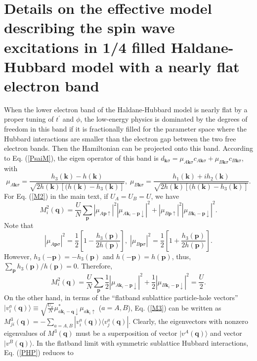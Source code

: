 \documentclass[amsmath,superscriptaddress,showpacs,aps,prl,twocolumn]{revtex4-1}
\begin{document}
\section{Details on the effective model describing the spin wave excitations in 1/4 filled Haldane-Hubbard model with a nearly flat electron band}
\par When the lower electron band of the Haldane-Hubbard model is nearly flat by a proper tuning of $t^\prime$ and $\phi$, the low-energy physics is dominated by the degrees of freedom in this band if it is fractionally filled for the parameter space where the Hubbard interactions are smaller than the electron gap between the two free electron bands. Then the Hamiltonian can be projected onto this band. According to Eq. (\ref{PsaiM}), the eigen operator of this band is $d_{\mathbf{k}\sigma}=\mu_{A\mathbf{k}\sigma}c_{A\mathbf{k}\sigma}+\mu_{B\mathbf{k}\sigma}c_{B\mathbf{k}\sigma}$, with
\begin{equation*}
\mu_{A\mathbf{k}\sigma} =  \frac{h_3(\mathbf{k})-h(\mathbf{k})}{\sqrt{2h(\mathbf{k})\left[(h(\mathbf{k})-h_3(\mathbf{k})\right]}}, \;
\mu_{B\mathbf{k}\sigma} =  \frac{h_1(\mathbf{k})+ih_2(\mathbf{k})}{\sqrt{2h(\mathbf{k})\left[(h(\mathbf{k})-h_3(\mathbf{k})\right]}}.
\end{equation*}
For Eq. (\ref{M2}) in the main text, if $U_A=U_B=U$, we have
\begin{equation*}
M^2_i(\mathbf{q})=\frac{U}{N}\sum_{\mathbf{p}}\left|\mu_{A\mathbf{p}\uparrow}\right|^2\left|\mu_{A\mathbf{k}_i-\mathbf{p}\downarrow}\right|^2
                 +\left|\mu_{B\mathbf{p}\uparrow}\right|^2\left|\mu_{B\mathbf{k}_i-\mathbf{p}\downarrow}\right|^2.
\end{equation*}
Note that
\begin{equation*}
\left|\mu_{A\mathbf{p}\sigma}\right|^2 = \frac{1}{2}\left[1-\frac{h_3(\mathbf{p})}{2h(\mathbf{p})}\right],\;
\left|\mu_{B\mathbf{p}\sigma}\right|^2 = \frac{1}{2}\left[1+\frac{h_3(\mathbf{p})}{2h(\mathbf{p})}\right].
\end{equation*}
However, $h_3(-\mathbf{p})=-h_3(\mathbf{p})$ and $h(-\mathbf{p})=h(\mathbf{p})$, thus, $\sum_{\mathbf{p}}h_3(\mathbf{p})/h(\mathbf{p})=0$. Therefore,
\begin{equation*}
M^2_i(\mathbf{q})=\frac{U}{N}\sum_{\mathbf{p}}\frac{1}{2}\left|\mu_{A\mathbf{k}_i-\mathbf{p}\downarrow}\right|^2
                 +\frac{1}{2}\left|\mu_{B\mathbf{k}_i-\mathbf{p}\downarrow}\right|^2
                 =\frac{U}{2}.
\end{equation*}
On the other hand, in terms of the ``flatband sublattice particle-hole vectors'' $|v^a_i(\mathbf{q})\rangle\equiv\sqrt{\frac{U_a}{N}}\mu^{\ast}_{a\mathbf{k}_i-\mathbf{q}\downarrow}\mu_{a\mathbf{k}_{i}\uparrow}$ ($a=A,B$), Eq. (\ref{M3}) can be written as $M^3_{ji}(\mathbf{q})=-\sum_{a=A,B}|v^a_i(\mathbf{q})\rangle\langle v^a_j(\mathbf{q})|$. Clearly, the eigenvectors with nonzero eigenvalues of $M^3(\mathbf{q})$ must be a superposition of vector $|v^A(\mathbf{q})\rangle$ and vector $|v^B(\mathbf{q})\rangle$. In the flatband limit with symmetric sublattice Hubbard interactions, Eq. (\ref{PHP}) reduces to
\end{document}
